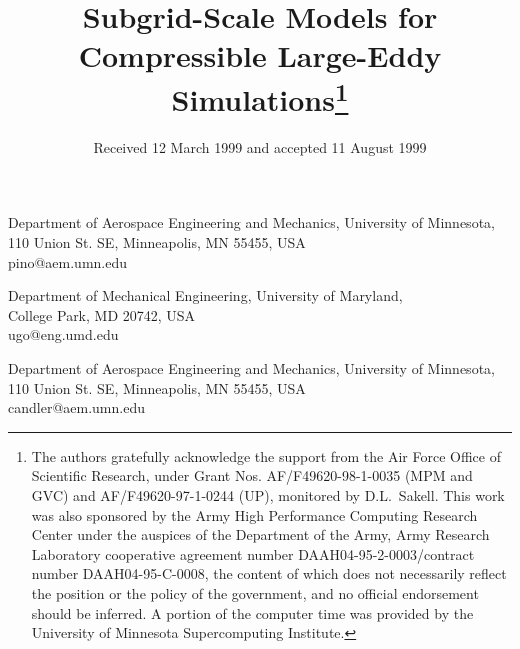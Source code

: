 \documentclass[tcfd]{svjour}
\begin{document}
\title{Subgrid-Scale Models for Compressible Large-Eddy
Simulations\thanks{The authors gratefully acknowledge the support from
the Air Force Off\/ice of Scientific Research, under Grant
Nos. AF/F49620-98-1-0035 (MPM and GVC) and AF/F49620-97-1-0244 (UP),
monitored by D.L.~Sakell. This work was also sponsored by the Army High
Performance Computing Research Center under the auspices of the
Department of the Army, Army Research Laboratory cooperative agreement
number DAAH04-95-2-0003/contract number DAAH04-95-C-0008, the content of
which does not necessarily ref\/lect the position or the policy of the
government, and no off\/icial endorsement should be inferred. A portion
of the computer time was provided by the University of Minnesota
Supercomputing Institute.}}

{Department of Aerospace Engineering and Mechanics, University of Minnesota,\\
110 Union St. SE, Minneapolis, MN 55455, USA\\
pino@aem.umn.edu}

{Department of Mechanical Engineering, University of Maryland,\\
College Park, MD 20742, USA\\
ugo@eng.umd.edu}

{Department of Aerospace Engineering and Mechanics, University of Minnesota,\\
110 Union St. SE, Minneapolis, MN 55455, USA\\
candler@aem.umn.edu}


\date{Received 12 March 1999 and accepted 11 August 1999}

\end{document}
